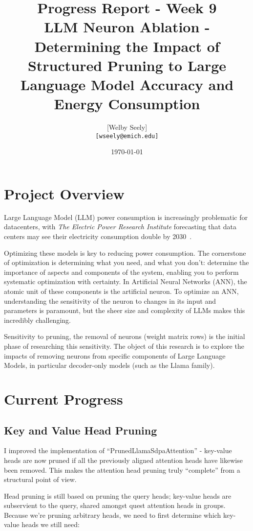 \documentclass{article}
\title{Progress Report - Week 9 \\
\large LLM Neuron Ablation - Determining the Impact of Structured Pruning to Large Language Model Accuracy and Energy Consumption}
\author{
    [Welby Seely] \\
    \texttt{[wseely@emich.edu]}
}
\date{\today}
\begin{document}
    \maketitle


    \section{Project Overview}\label{sec:project-overview}
    Large Language Model (LLM) power consumption is increasingly problematic for datacenters, with \textit{The Electric Power
    Research Institute} forecasting that data centers may see their electricity consumption double by
    2030~\cite{kindig2024}.

    Optimizing these models is key to reducing power consumption.
    The cornerstone of optimization is determining what you need, and what you don't: determine the importance of
    aspects and components of the system, enabling you to perform systematic optimization with certainty.
    In Artificial Neural Networks (ANN), the atomic unit of these components is the artificial neuron.
    To optimize an ANN, understanding the sensitivity of the neuron to changes in its input and parameters is paramount,
    but the sheer size and complexity of LLMs makes this incredibly challenging.

    Sensitivity to pruning, the removal of neurons (weight matrix rows) is the initial phase of researching this sensitivity.
    The object of this research is to explore the impacts of removing neurons from specific components of Large Language Models, in particular decoder-only models (such as the Llama family).

    \section{Current Progress}\label{sec:current-progress}

    \subsection{Key and Value Head Pruning}\label{subsec:key-and-value-project-pruning}

    I improved the implementation of ``PrunedLlamaSdpaAttention'' - key-value heads are now pruned if all the
    previously aligned attention heads have likewise been removed.
    This makes the attention head pruning truly ``complete'' from a structural point of view.

    Head pruning is still based on pruning the query heads; key-value heads are subservient to the query,
    shared amongst quest attention heads in groups.
    Because we're pruning arbitrary heads, we need to first determine which key-value heads we still need:
\end{document}
